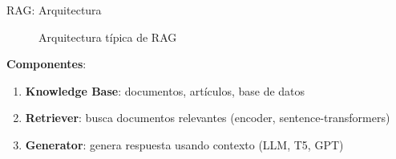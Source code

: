 \begin{frame}{RAG: Arquitectura}

\begin{figure}
    \centering
    \caption{Arquitectura típica de RAG}
\end{figure}

\textbf{Componentes}:
\begin{enumerate}
    \item \textbf{Knowledge Base}: documentos, artículos, base de datos
    \item \textbf{Retriever}: busca documentos relevantes (encoder, sentence-transformers)
    \item \textbf{Generator}: genera respuesta usando contexto (LLM, T5, GPT)
\end{enumerate}

\end{frame}

